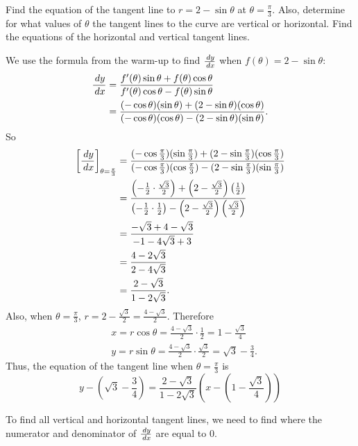 \documentclass[handout]{ximera}
\begin{document}
\begin{problem}
Find the equation of the tangent line to $r = 2 - \sin \theta$ at $\theta = \frac{\pi}{3}$.  
Also, determine for what values of $\theta$ the tangent lines to the curve are vertical or horizontal.  Find the equations of the horizontal and vertical tangent lines.
	\begin{freeResponse}
	We use the formula from the warm-up to find $\frac{\,d y}{\,d x}$ when $f(\theta) = 2 - \sin \theta$:
		\begin{align*}
		\frac{\,d y}{\,d x}
		&= \frac{f'(\theta) \sin \theta + f(\theta) \cos \theta}{f'(\theta) \cos \theta - f(\theta) \sin \theta } \\
		&= \frac{(- \cos \theta)(\sin \theta) + (2 - \sin \theta)(\cos \theta)}{(-\cos \theta)(\cos \theta) - (2 - \sin \theta)(\sin \theta)}.
		\end{align*}
	So
		\begin{align*}
		\bigg[ \frac{\,d y}{\,d x} \bigg]_{\theta = \frac{\pi}{3}} 
		&= \frac{(- \cos \frac{\pi}{3})(\sin \frac{\pi}{3}) + (2 - \sin \frac{\pi}{3})(\cos \frac{\pi}{3})}{(-\cos \frac{\pi}{3})(\cos \frac{\pi}{3}) - (2 - \sin \frac{\pi}{3})(\sin \frac{\pi}{3})}  \\
		&= \frac{\left( - \frac{1}{2} \cdot \frac{\sqrt{3}}{2} \right) + \left( 2 - \frac{\sqrt{3}}{2} \right) \left( \frac{1}{2} \right)}{\left( - \frac{1}{2} \cdot \frac{1}{2} \right) - \left( 2 - \frac{\sqrt{3}}{2} \right) \left( \frac{\sqrt{3}}{2} \right)}  \\
		&= \frac{- \sqrt{3} + 4 - \sqrt{3}}{-1 - 4 \sqrt{3} + 3}  \\
		&= \frac{4 - 2 \sqrt{3}}{2 - 4 \sqrt{3}}  \\
		&= \frac{2 - \sqrt{3}}{1 - 2 \sqrt{3}}.
		\end{align*}
	Also, when $\theta = \frac{\pi}{3}$, $r = 2 - \frac{\sqrt{3}}{2} = \frac{4 - \sqrt{3}}{2}$.  
	Therefore
		\begin{align*}
		&x = r \cos \theta = \frac{4 - \sqrt{3}}{2} \cdot \frac{1}{2} = 1 - \frac{\sqrt{3}}{4}  \\
		&y = r \sin \theta = \frac{4 - \sqrt{3}}{2} \cdot \frac{\sqrt{3}}{2} = \sqrt{3} - \frac{3}{4}.
		\end{align*}
	Thus, the equation of the tangent line when $\theta = \frac{\pi}{3}$ is
		\[
		\boxed{y - \left( \sqrt{3} - \frac{3}{4} \right) = \frac{2 - \sqrt{3}}{1 - 2 \sqrt{3}} \left( x - \left( 1 - \frac{\sqrt{3}}{4} \right) \right)}
		\]
		
	To find all vertical and horizontal tangent lines, we need to find where the numerator and denominator of $\frac{\,d y}{\,d x}$ are equal to $0$.
	

\end{freeResponse}
\end{problem}
\end{document}
